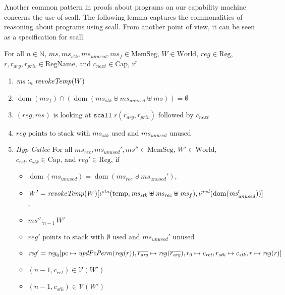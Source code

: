 \documentclass[format=acmsmall, review=true, screen=true]{acmart}
\DeclareMathOperator{\dom}{dom}
\newcommand{\var}[1]{\mathit{#1}}
\newcommand{\hs}{\var{ms}}
\newcommand{\ms}{\hs}
\newcommand{\pcreg}{\mathrm{pc}}
\newcommand{\reg}{\var{reg}}
\newcommand{\heap}{\var{mem}}
\newcommand{\stk}{\var{stk}}
\newcommand{\pwl}{\var{pwl}}
\newcommand{\sta}{\var{sta}}
\newcommand{\plainfun}[2]{
  \ifthenelse{\equal{#2}{}}
  {\mathit{#1}}
  {\mathit{#1}(#2)}
}
\newcommand{\updatePcPerm}[1]{\plainfun{updPcPerm}{#1}}
\newcommand{\revokeTemp}[1]{\plainfun{revokeTemp}{#1}}
\newcommand{\heapSat}[3][\heap]{#1 :_{#2} #3}
\newcommand{\memSat}[3][n]{\heapSat[#2]{#1}{#3}}
\newcommand{\asmType}{\plaindom{AsmType}}
\newcommand{\plaindom}[1]{\mathrm{#1}}
\newcommand{\Caps}{\plaindom{Cap}}
\newcommand{\RegName}{\plaindom{RegName}}
\newcommand{\Regs}{\plaindom{Reg}}
\newcommand{\HeapSegments}{\plaindom{MemSeg}}
\newcommand{\MemSegments}{\HeapSegments}
\newcommand{\nats}{\mathbb{N}}
\newcommand{\Worlds}{\plaindom{World}}
\newcommand{\intr}[2]{\mathcal{#1}}
\newcommand{\valueintr}[1]{\intr{V}{#1}}
\newcommand{\stdvr}{\valueintr{\asmType}}
\newcommand{\npair}[2][n]{\left(#1,#2 \right)}
\newcommand{\plainview}[1]{\mathrm{#1}}
\newcommand{\temp}{\plainview{temp}}
\newenvironment{toplas}%
    {\color{OliveGreen}}{}
\begin{document}
\begin{toplas}
Another common pattern in proofs about programs on our capability machine
concerns the use of scall. The following lemma captures the commonalities of
reasoning about programs using scall. From another point of view, it can be seen
as a specification for scall.
\begin{lemma}
  \label{lem:scall-works}
  For all $n \in \nats$, $\ms, \ms_\stk, \ms_\var{unused}, \ms_f \in \MemSegments$, $W
  \in \Worlds$, $\reg \in \Regs$, $r,\overline{r_{\mathit{arg}}},
  \overline{r_{\mathit{priv}}} \in \RegName$, and $c_\var{next} \in \Caps$,
  if
  \begin{enumerate}
  \item \label{item:scall:memsat} $\memSat[n]{\ms}{\revokeTemp{W}}$ 
  \item $\dom(\ms_f) \cap (\dom(\ms_\stk \uplus \ms_{\mathit{unused}} \uplus \ms)) = \emptyset$
  \item \label{item:scall:stack} $(\reg,\ms) \text{ is looking at }
    \mathtt{scall}\;r(\overline{r_{\mathit{arg}}},
    \overline{r_{\mathit{priv}}}) \text{ followed by }
    c_{\mathit{next}}$
  \item $\reg \text{ points to stack with $\ms_\stk$ used and $\ms_{\mathit{unused}}$ unused}$
  \item \label{item:scall:hyp-callee} \emph{Hyp-Callee} For all  $\ms_\var{rec},
    \ms_\var{unused}', \ms'' \in \MemSegments$, $W' \in \Worlds$, $c_\var{ret},
    c_\stk \in \Caps$, and $\reg' \in \Regs$, if
    \begin{itemize}
    \item $\dom(\ms_{\mathit{unused}}) = \dom(\ms_{\mathit{rec}}
      \uplus \ms_{\mathit{unused}}')$,
    \item $W' =
      \revokeTemp{W}[\iota^{\sta}(\temp,\ms_\stk\uplus\ms_{\mathit{rec}} \uplus \ms_f),\iota^{\pwl}(\dom(\ms_{\mathit{unused}}'))]$,
    \item $\memSat[n-1]{\ms''}{W'}$
    \item $\reg' \text{ points to stack with $\emptyset$ used and $\ms_{\mathit{unused}}'$ unused}$
    \item $\reg'= \reg_0[\pcreg\mapsto\updatePcPerm{\reg(r)},
      \overline{r_{\mathit{arg}}} \mapsto \reg(\overline{r_{\mathit{arg}}}),r_0
      \mapsto c_{\mathit{ret}}, r_\stk \mapsto c_\stk, r \mapsto \reg(r)]$ 
    \item $\npair[n-1]{c_{\mathit{ret}}} \in \stdvr(W')$
    \item $\npair[n-1]{c_\stk} \in \stdvr(W')$
    \end{itemize}


\end{enumerate}
\end{lemma}
\end{toplas}
\end{document}
